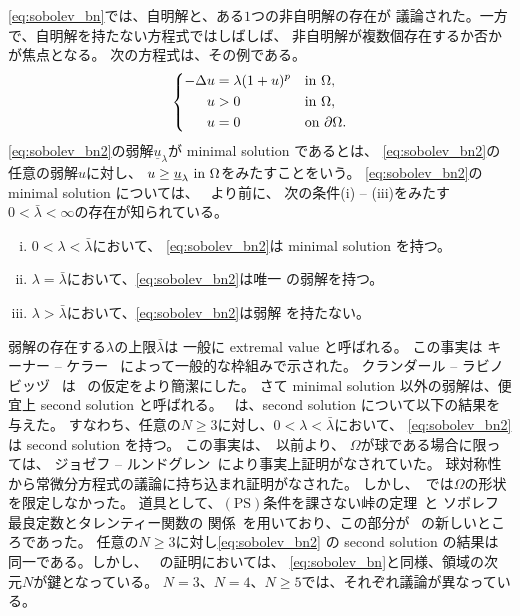 \eqref{eq:sobolev_bn}では、自明解と、ある$1$つの非自明解の存在が
議論された。一方で、自明解を持たない方程式ではしばしば、
非自明解が複数個存在するか否かが焦点となる。
次の方程式は、その例である。
\begin{align}
 \left\{
 \begin{aligned}
  -\Delta u &= \lambda (1 + u)^p  & &\text{in}~ \Omega,  \\
  u &> 0 & &\text{in}~ \Omega, \\
  u &= 0 & &\text{on}~ \partial\Omega.
 \end{aligned}
 \right. \label{eq:sobolev_bn2}
\end{align}
\eqref{eq:sobolev_bn2}の弱解$\underline{u}_\lambda$が
minimal solution であるとは、
\eqref{eq:sobolev_bn2}の任意の弱解$u$に対し、
$u \geq \underline{u}_\lambda ~\text{in}~ \Omega$をみたすことをいう。
\eqref{eq:sobolev_bn2}の minimal solution については、
\cite{MR709644}~より前に、
次の条件(i) -- (iii)をみたす$0 < \bar{\lambda} < \infty$の存在が知られている。
\begin{enumerate}[(i)]
 \item $0 < \lambda < \bar{\lambda}$において、
       \eqref{eq:sobolev_bn2}は minimal solution を持つ。
 \item $\lambda = \bar{\lambda}$において、\eqref{eq:sobolev_bn2}は唯一
       の弱解を持つ。
 \item $\lambda > \bar{\lambda}$において、\eqref{eq:sobolev_bn2}は弱解
       を持たない。
\end{enumerate}
弱解の存在する$\lambda$の上限$\bar{\lambda}$は
一般に extremal value と呼ばれる。
この事実は
キーナー -- ケラー \cite{MR0346305}~によって一般的な枠組みで示された。
クランダール -- ラビノビッヅ \cite{MR0382848}~は
\cite{MR0346305}~の仮定をより簡潔にした。
さて minimal solution 以外の弱解は、便宜上 second solution と呼ばれる。
\cite{MR709644}~は、second solution について以下の結果を与えた。
すなわち、任意の$N \geq 3$に対し、$0 < \lambda < \bar{\lambda}$において、
\eqref{eq:sobolev_bn2}は second solution を持つ。
この事実は、\cite{MR709644}~以前より、
$\Omega$が球である場合に限っては、
ジョゼフ -- ルンドグレン\cite{MR0340701}~により事実上証明がなされていた。
球対称性から常微分方程式の議論に持ち込まれ証明がなされた。
しかし、\cite{MR709644}~では$\Omega$の形状を限定しなかった。
道具として、$(\mathrm{PS})$条件を課さない峠の定理~\cite{MR0370183}と
ソボレフ最良定数とタレンティー関数の
関係~\cite{MR0463908}を用いており、この部分が
\cite{MR709644}~の新しいところであった。
任意の$N \geq 3$に対し\eqref{eq:sobolev_bn2}
の second solution の結果は同一である。しかし、
\cite{MR709644}~の証明においては、
\eqref{eq:sobolev_bn}と同様、領域の次元$N$が鍵となっている。
$N = 3$、$N = 4$、$N \geq 5$では、それぞれ議論が異なっている。

